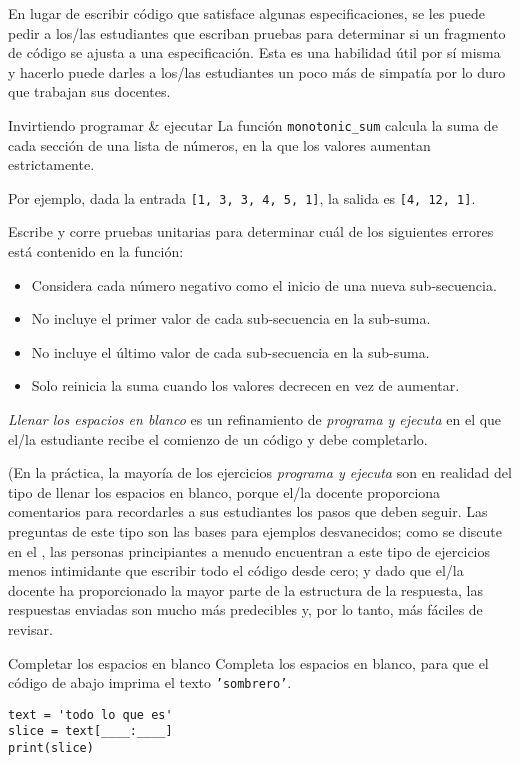 En lugar de escribir código que satisface algunas especificaciones,  
se les puede pedir a los/las estudiantes que escriban pruebas para determinar si un fragmento de código se ajusta a una especificación. 
Esta es una habilidad útil por sí misma y hacerlo puede darles a los/las estudiantes un poco más de simpatía por lo duro que trabajan sus docentes.

\begin{aside}{Invirtiendo programar \& ejecutar}
 La función \texttt{monotonic\_sum} calcula la suma de cada sección de una lista de números, en la que los valores aumentan estrictamente.

Por ejemplo,
  dada la entrada \texttt{[1,\ 3,\ 3,\ 4,\ 5,\ 1]},
  la salida es  \texttt{[4,\ 12,\ 1]}.

Escribe y corre pruebas unitarias para determinar cuál de los siguientes errores está contenido en la función:

   \begin{itemize}
  \item
    Considera cada número negativo como el inicio de una nueva sub-secuencia.
  \item
    No incluye el primer valor de cada sub-secuencia en la sub-suma.
  \item
    No incluye el último valor de cada sub-secuencia en la sub-suma.
  \item
    Solo reinicia la suma cuando los valores decrecen en vez de aumentar.
  \end{itemize}
\end{aside}


\emph{Llenar los espacios en blanco} es un refinamiento de \emph{programa y ejecuta}
en el que el/la estudiante recibe el comienzo de un código y debe completarlo.

(En la práctica, la mayoría de los ejercicios \emph{programa y ejecuta} son en realidad del tipo de llenar los espacios en blanco, porque el/la docente proporciona comentarios
para recordarles a sus estudiantes los pasos que deben seguir. 
Las preguntas de este tipo son las bases para ejemplos desvanecidos;
como se discute en el ,
las personas principiantes a menudo encuentran a este tipo de ejercicios  menos intimidante que escribir todo el código desde cero;
y dado que el/la docente ha proporcionado la mayor parte de la estructura de la respuesta,
las respuestas enviadas son mucho más predecibles y, por lo tanto, más fáciles de revisar.

\begin{aside}{Completar los espacios en blanco}
 Completa los espacios en blanco,
 para que el código de abajo imprima el texto  \texttt{'sombrero'}.

\begin{verbatim}
text = 'todo lo que es'
slice = text[____:____]
print(slice)
\end{verbatim}
\end{aside}

